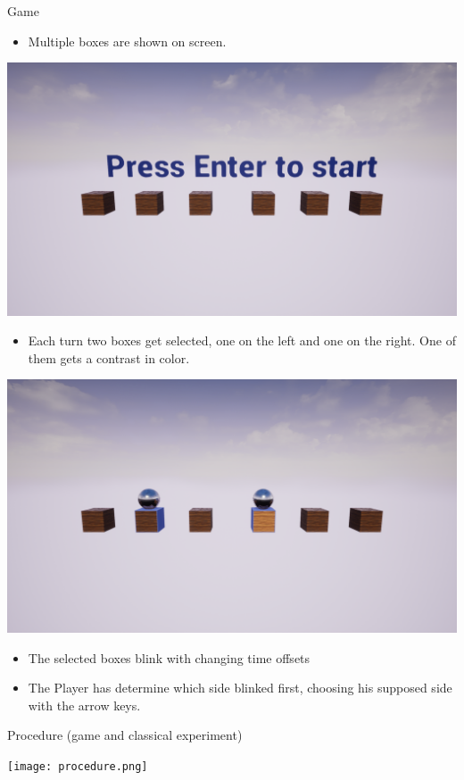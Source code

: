 \documentclass[a0paper,portrait]{baposter}
\begin{document}
\begin{poster}
		\begin{posterbox}[name=game,span=1,column=1,row=1,below=intro]{Game}
			\begin{itemize}
				\item Multiple boxes are shown on screen.
			\end{itemize}
			\includegraphics[width=1\textwidth]{Screenshots/gameStart.png}
			\begin{itemize}
				\item Each turn two boxes get selected, one on the left and one on the right. One of them gets a contrast in color.
			\end{itemize}
			\includegraphics[width=1 \textwidth]{Screenshots/bothStimuli.png}
			\begin{itemize}
				\item The selected boxes blink with changing time offsets
			\end{itemize}
			\begin{itemize}
				\item The Player has determine which side blinked first, choosing his supposed side with the arrow keys.
			\end{itemize}
		\end{posterbox}
		\begin{posterbox}[name=procedure,span=2,column=0,row=2, below=game]{Procedure (game and classical experiment)}
			\begin{center}
				\texttt{[image: procedure.png]}
			\end{center}
		\end{posterbox}
		

\end{poster}
\end{document}
